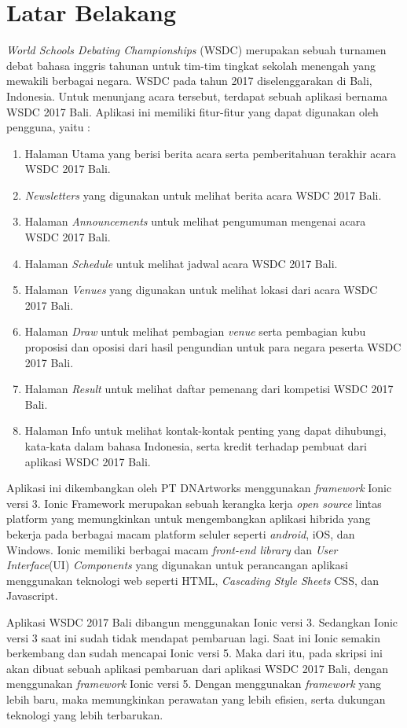 \documentclass[a4paper,twoside]{article}
\begin{document}
\section{Latar Belakang}
\textit{World Schools Debating Championships} (WSDC) merupakan sebuah turnamen debat bahasa inggris tahunan untuk tim-tim tingkat sekolah menengah yang mewakili berbagai negara. WSDC pada tahun 2017 diselenggarakan di Bali, Indonesia. Untuk menunjang acara tersebut, terdapat sebuah aplikasi bernama WSDC 2017 Bali. Aplikasi ini memiliki fitur-fitur yang dapat digunakan oleh pengguna, yaitu : 

\begin{enumerate}
	\item Halaman Utama yang berisi berita acara serta pemberitahuan terakhir acara WSDC 2017 Bali.
	\item \textit{Newsletters} yang digunakan untuk melihat berita acara WSDC 2017 Bali.
	\item Halaman \textit{Announcements} untuk melihat pengumuman mengenai acara WSDC 2017 Bali.
	\item Halaman \textit{Schedule} untuk melihat jadwal acara WSDC 2017 Bali.
	\item Halaman \textit{Venues} yang digunakan untuk melihat lokasi dari acara WSDC 2017 Bali.
	\item Halaman \textit{Draw} untuk melihat pembagian \textit{venue} serta pembagian kubu proposisi dan oposisi dari hasil pengundian untuk para negara peserta WSDC 2017 Bali.
	\item Halaman \textit{Result} untuk melihat daftar pemenang dari kompetisi WSDC 2017 Bali. 
	\item Halaman Info untuk melihat kontak-kontak penting yang dapat dihubungi, kata-kata dalam bahasa Indonesia, serta kredit terhadap pembuat dari aplikasi WSDC 2017 Bali.
\end{enumerate}

Aplikasi ini dikembangkan oleh PT DNArtworks menggunakan \textit{framework} Ionic versi 3. Ionic Framework merupakan sebuah kerangka kerja {\it open source} lintas platform yang memungkinkan untuk mengembangkan aplikasi hibrida yang bekerja pada berbagai macam platform seluler seperti {\it android}, iOS, dan Windows. Ionic memiliki berbagai macam \textit{front-end library} dan \textit{User Interface}(UI) {\it Components} yang digunakan untuk  perancangan aplikasi menggunakan teknologi web seperti HTML, {\it Cascading Style Sheets} CSS, dan Javascript. 

Aplikasi WSDC 2017 Bali dibangun menggunakan Ionic versi 3. Sedangkan Ionic versi 3 saat ini sudah tidak mendapat pembaruan lagi. Saat ini Ionic semakin berkembang dan sudah mencapai Ionic versi 5. Maka dari itu, pada skripsi ini akan dibuat sebuah aplikasi pembaruan dari aplikasi WSDC 2017 Bali, dengan menggunakan \textit{framework} Ionic versi 5. Dengan menggunakan \textit{framework} yang lebih baru, maka memungkinkan perawatan yang lebih efisien, serta dukungan teknologi yang lebih terbarukan.
\end{document}
